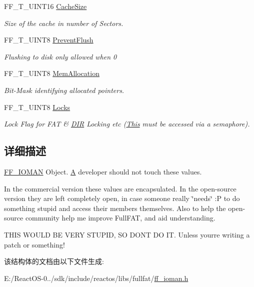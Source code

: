 \begin{DoxyCompactItemize}
F\+F\+\_\+\+T\+\_\+\+U\+I\+N\+T16 \hyperlink{struct_f_f___i_o_m_a_n_a665d1e4cb234f2da085508e92a6c7188}{Cache\+Size}
\begin{DoxyCompactList}\small\item\em Size of the cache in number of Sectors. \end{DoxyCompactList}\item 
\mbox{\label{struct_f_f___i_o_m_a_n_a846ef72e0b6afee1cabae2f9ceebc7b6}} 
F\+F\+\_\+\+T\+\_\+\+U\+I\+N\+T8 \hyperlink{struct_f_f___i_o_m_a_n_a846ef72e0b6afee1cabae2f9ceebc7b6}{Prevent\+Flush}
\begin{DoxyCompactList}\small\item\em Flushing to disk only allowed when 0 \end{DoxyCompactList}\item 
\mbox{\label{struct_f_f___i_o_m_a_n_a6b518d5429b73220e1ba1f77c277ccd6}} 
F\+F\+\_\+\+T\+\_\+\+U\+I\+N\+T8 \hyperlink{struct_f_f___i_o_m_a_n_a6b518d5429b73220e1ba1f77c277ccd6}{Mem\+Allocation}
\begin{DoxyCompactList}\small\item\em Bit-\/\+Mask identifying allocated pointers. \end{DoxyCompactList}\item 
\mbox{\label{struct_f_f___i_o_m_a_n_a154fd60a275bf0bba8ca6426f943f06f}} 
F\+F\+\_\+\+T\+\_\+\+U\+I\+N\+T8 \hyperlink{struct_f_f___i_o_m_a_n_a154fd60a275bf0bba8ca6426f943f06f}{Locks}
\begin{DoxyCompactList}\small\item\em Lock Flag for F\+AT \& \hyperlink{struct_d_i_r}{D\+IR} Locking etc (\hyperlink{namespace_this}{This} must be accessed via a semaphore). \end{DoxyCompactList}\end{DoxyCompactItemize}


\subsection{详细描述}
\hyperlink{struct_f_f___i_o_m_a_n}{F\+F\+\_\+\+I\+O\+M\+AN} Object. \hyperlink{struct_a}{A} developer should not touch these values. 

In the commercial version these values are encapsulated. In the open-\/source version they are left completely open, in case someone really \char`\"{}needs\char`\"{} \+:P to do something stupid and access their members themselves. Also to help the open-\/source community help me improve Full\+F\+AT, and aid understanding.

T\+H\+IS W\+O\+U\+LD BE V\+E\+RY S\+T\+U\+P\+ID, SO D\+ON\textquotesingle{}T DO IT. Unless your\textquotesingle{}re writing a patch or something! 

该结构体的文档由以下文件生成\+:\begin{DoxyCompactItemize}
\item 
E\+:/\+React\+O\+S-\/0../sdk/include/reactos/libs/fullfat/\hyperlink{ff__ioman_8h}{ff\+\_\+ioman.\+h}\end{DoxyCompactItemize}
